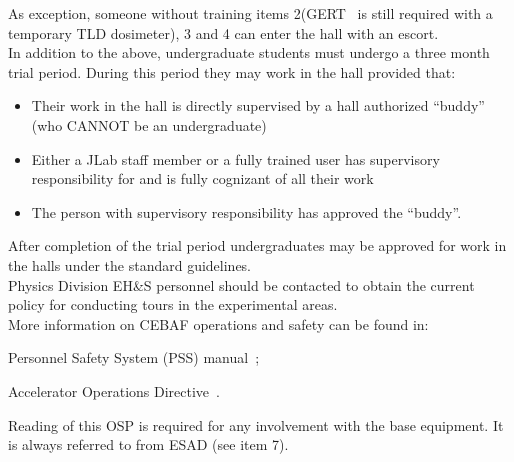 {As exception, someone without training items 2(GERT~\cite{RWIcebaf} is still required
with a temporary TLD dosimeter),
3 and 4 can enter the hall with an escort. \\

 In addition to the above, undergraduate students must undergo a three
 month trial period. During this period they may work in the hall
 provided that:

\begin{itemize}
\item Their work in the hall is directly supervised by a hall
 authorized ``buddy'' (who CANNOT be an undergraduate)
\item Either a JLab staff member or a fully trained user has
 supervisory responsibility for and is fully cognizant of all their
 work
\item The person with supervisory responsibility has approved the
``buddy''.
\end{itemize}

\noindent{}After completion of the trial period undergraduates may be
approved for work in the halls under the standard guidelines. \\ 

\noindent{}Physics Division EH\&S personnel should be contacted to obtain
the current policy for conducting tours in the experimental areas.\\ 

\noindent{} More information on CEBAF operations and safety can be found in:
 \begin{list}{--}{\setlength{\itemsep}{-0.2cm}}
    \item Personnel Safety System (PSS) manual~\cite{PSScebaf};
    \item Accelerator Operations Directive~\cite{AODcebaf}.
 \end{list}


 \noindent{}Reading of this OSP is required for any involvement
 with the base equipment. 
 It is always referred to from ESAD (see item 7).
}

